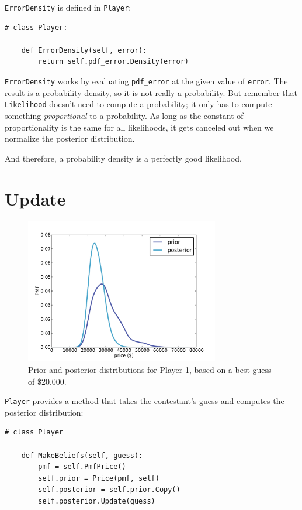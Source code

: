 \documentclass[12pt]{book}
\begin{document}
{\tt ErrorDensity} is defined in {\tt Player}:

\begin{verbatim}
# class Player:

    def ErrorDensity(self, error):
        return self.pdf_error.Density(error)
\end{verbatim}

{\tt ErrorDensity} works by evaluating \verb"pdf_error" at
the given value of {\tt error}.
The result is a probability density, so it is not really a probability.
But remember that {\tt Likelihood} doesn't
need to compute a probability; it only has to compute something {\em
  proportional} to a probability.  As long as the constant of
proportionality is the same for all likelihoods, it gets canceled out
when we normalize the posterior distribution.

And therefore, a probability density is a perfectly good likelihood.


\section{Update}

\begin{figure}
\centerline{\includegraphics[height=2.5in]{figs/price3.pdf}}
\caption{Prior and posterior distributions for Player 1, based on
  a best guess of \$20,000.}
\label{fig.price3}
\end{figure}


{\tt Player} provides a method that takes the contestant's
guess and computes the posterior distribution:

\begin{verbatim}
# class Player

    def MakeBeliefs(self, guess):
        pmf = self.PmfPrice()
        self.prior = Price(pmf, self)
        self.posterior = self.prior.Copy()
        self.posterior.Update(guess)
\end{verbatim}
\end{document}
